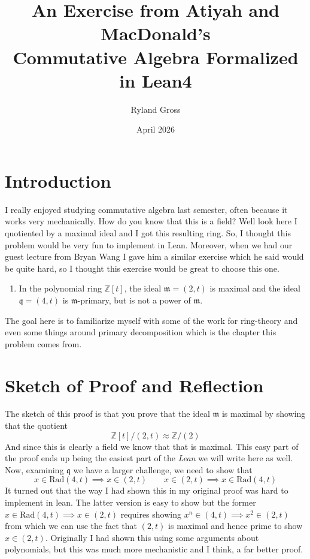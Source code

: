 \documentclass{article}
\title{An Exercise from Atiyah and MacDonald's \\ Commutative Algebra Formalized in Lean4}
\author{Ryland Gross}
\date{April 2026}
\begin{document}
\maketitle
\large
\section{Introduction}

I really enjoyed studying commutative algebra last semester, often because it works very mechanically. How do you know that this is a field? Well look here I quotiented by a maximal ideal and I got this resulting ring. So, I thought this problem would be very fun to implement in Lean. Moreover, when we had our guest lecture from Bryan Wang I gave him a similar exercise which he said would be quite hard, so I thought this exercise would be great to choose this one. 

\begin{enumerate}

\item In the polynomial ring $\mathbb{Z}[t]$, the ideal 
$
\mathfrak{m} = (2,t)$
is maximal and the ideal 
$
\mathfrak{q} = (4,t)
$
is $\mathfrak{m}$-primary, but is not a power of $\mathfrak{m}$.

\end{enumerate}

The goal here is to familiarize myself with some of the work for ring-theory and even some things around primary decomposition which is the chapter this problem comes from. 

\section{Sketch of Proof and Reflection}

The sketch of this proof is that you prove that the ideal $\mathfrak{m}$ is maximal by showing that the quotient $$\mathbb{Z}[t]/(2,t) \approx \mathbb{Z}/(2)$$ And since this is clearly a field we know that that is maximal. This easy part of the proof ends up being the easiest part of the \emph{Lean} we will write here as well. Now, examining $\mathfrak{q}$ we have a larger challenge, we need to show that $$x \in \text{Rad}(4,t) \implies x \in (2,t) \qquad x \in (2,t) \implies x \in \text{Rad}(4,t)$$ It turned out that the way I had shown this in my original proof was hard to implement in lean. The latter version is easy to show but the former $x \in \text{Rad}(4,t) \implies x \in (2,t)$ requires showing $x^n \in (4,t) \implies x^2 \in (2,t)$ from which we can use the fact that $(2,t)$ is maximal and hence prime to show $x \in (2,t)$. Originally I had shown this using some arguments about polynomials, but this was much more mechanistic and I think, a far better proof. 
\end{document}
